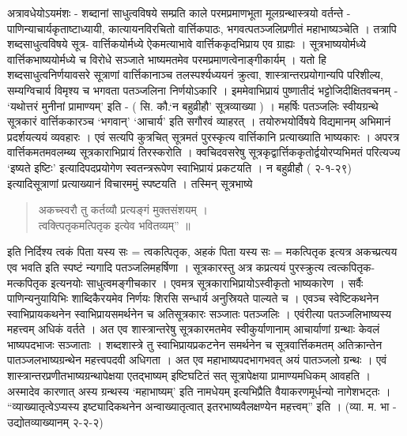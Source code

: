 अत्रावधेयोऽयमंशः - शब्दानां साधुत्वविषये सम्प्रति काले परमप्रमाणभूता मूलग्रन्थास्त्रयो वर्तन्ते - पाणिन्याचार्यकृताष्टाध्यायी, कात्यायनविरचितो वार्त्तिकपाठः, भगवत्पतञ्जलिप्रणीतं महाभाष्यञ्चेति । तत्रापि शब्दसाधुत्वविषये सूत्र- वार्त्तिकयोर्मध्ये ऐकमत्याभावे वार्त्तिककृदभिप्राय एव ग्राह्यः । सूत्रभाष्ययोर्मध्ये वार्त्तिकभाष्ययोर्मध्ये च विरोधे सञ्जाते भाष्यमतमेव परमप्रमाणत्वेनाङ्गीकार्यम् । यतो हि शब्दसाधुत्वनिर्णयावसरे सूत्राणां वार्त्तिकानाञ्च तलस्पर्श्यध्ययनं क्रुत्वा, शास्त्रान्तरप्रयोगान्यपि परिशील्य, सम्यग्विचार्य विमृश्य च भगवता पतञ्जलिना निर्णयोऽकारि । इममेवाभिप्रायं पुष्णातीदं भट्टोजिदीक्षितवचनम् - ‘यथोत्तरं मुनीनां प्रामाण्यम्’ इति - ( सि. कौ.‘न बहुव्रीहौ’ सूत्रव्याख्या ) । महर्षिः पतञ्जलिः स्वीयग्रन्थे सूत्रकारं वार्त्तिककारञ्च ‘भगवान्’ ‘आचार्य’ इति सगौरवं व्याहरत् । तयोरुभयोर्विषये विद्यमानम् अभिमानं प्रदर्शयत्ययं व्यवहारः । एवं सत्यपि कुत्रचित् सूत्रमतं पुरस्कृत्य वार्त्तिकानि प्रत्याख्याति भाष्यकारः । अपरत्र वार्त्तिकमतमवलम्ब्य सूत्रकाराभिप्रायं तिरस्करोति । क्वचिदवसरेषु सूत्रकृद्वार्त्तिककृतोर्द्वयोरप्यभिमतं परित्यज्य ‘इष्यते इष्टिः’ इत्यादिपदप्रयोगेण स्वतन्त्ररूपेण स्वाभिप्रायं प्रकटयति । न बहुव्रीहौ ( २-१-२९) इत्यादिसूत्राणां प्रत्याख्यानं विचारममुं स्पष्टयति । तस्मिन् सूत्रभाष्ये
\begin{verse}
अकच्स्वरौ तु कर्तव्यौ प्रत्यङ्गं मुक्तसंशयम् ।\\
त्वक्त्पितृकमत्पितृक इत्येव भवितव्यम्” ॥
\end{verse}
इति निर्दिश्य त्वकं पिता यस्य सः = त्वकत्पितृक, अहकं पिता यस्य सः = मकत्पितृक इत्यत्र अकच्प्रत्यय एव भवति इति स्पष्टं न्यगादि पतञ्जलिमहर्षिणा । सूत्रकारस्तु अत्र कप्रत्ययं पुरस्क्रुत्य त्वत्कपितृक-मत्कपितृक इत्यनयोः साधुत्वमङ्गीचकार । एवमत्र सूत्रकाराभिप्रायोऽस्वीकृतो भाष्यकारेण । सर्वैः पाणिन्यनुयायिभिः शाब्दिकैरयमेव निर्णयः शिरसि सन्धार्य अनुस्रियते पाल्यते च । एवञ्च स्वेष्टिकथनेन स्वाभिप्रायकथनेन स्वाभिप्रायसमर्थनेन च अतिसूत्रकारः सञ्जातः पतञ्जलिः । एवंरीत्या पतञ्जलिभाष्यस्य महत्त्वम् अधिकं वर्तते । अत एव शास्त्रान्तरेषु सूत्रकारमतमेव स्वीकुर्याणानाम् आचार्याणां ग्रन्थाः केवलं भाष्यपदभाजः सञ्जाताः । शब्दशास्त्रे तु स्वाभिप्रायप्रकटनेन समर्थनेन च सूत्रवार्त्तिकमतम् अतिक्रान्तेन पातञ्जलभाष्यग्रन्थेन महत्त्वपदवी अधिगता । अत एव महाभाष्यपदभागभवत् अयं पातञ्जलो ग्रन्थः । एवं शास्त्रान्तरप्रणीतभाष्यग्रन्थापेक्षया एतद्भाष्यम् इष्टिघटितं सत् सूत्रापेक्षया प्रामाण्यमधिकम् आवहति । अस्मादेव कारणात् अस्य ग्रन्थस्य ‘महाभाष्यम्’ इति नामधेयम् इत्यभिप्रैति वैयाकरणमूर्धन्यो नागेशभट्तः । “व्याख्यातृत्वेऽप्यस्य इष्ट्यादिकथनेन अन्वाख्यातृत्वात् इतरभाष्यवैलक्षण्येन महत्त्वम्” इति । (व्या. म. भा - उद्योतव्याख्यानम् २-२-२)

